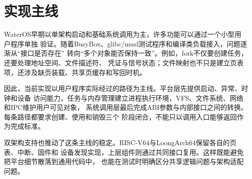 \section{实现主线}

WaterOS早期以单架构启动和基础系统调用为主，许多功能可以通过一个小型用户程序单独
验证。随着BusyBox、glibc/musl测试程序和编译类负载接入，问题逐渐从“接口是否存在”
转向“多个对象能否保持一致”。例如，fork不仅要创建任务，还要处理地址空间、文件描述符、
凭证与信号状态；文件映射也不只是建立页表项，还涉及缺页装载、共享页缓存和写回时机。

因此，当前实现以用户程序实际经过的路径为主线。平台层先提供启动、异常、时钟和设备
访问能力，任务与内存管理建立进程执行环境，VFS、文件系统、网络和IPC维护用户可见对象，
系统调用层最后完成ABI参数与内部接口之间的转换。每条路径都要求创建、使用和销毁三个
阶段闭合，不能只以调用入口能够返回作为完成标准。

双架构支持也推动了这条主线的稳定。RISC-V64与LoongArch64保留各自的页表、中断、固件和
设备发现实现，上层组件则通过共同接口复用。这样既能避免把平台细节散落到通用代码中，
也能在测试时明确区分共享逻辑问题与架构适配问题。
